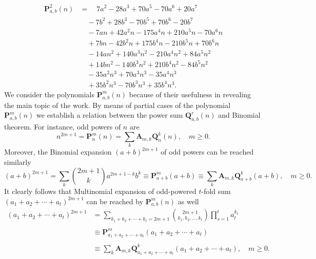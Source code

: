 \documentclass[12pt, letterpaper]{amsart}
\theoremstyle{definition}
\theoremstyle{remark}
\numberwithin{equation}{section}
\begin{document}
\begin{equation*}
\begin{split}
\mathbf{P}^{2}_{a,b}(n)
&= \quad 7 a^2 - 28 a^3 + 70 a^5 - 70 a^6 + 20 a^7 \\
&\quad - 7 b^2 + 28 b^3 - 70 b^5 + 70 b^6 - 20 b^7 \\
&\quad - 7 a n + 42 a^2 n - 175 a^4 n + 210 a^5 n -70 a^6 n \\
&\quad + 7 b n - 42 b^2 n + 175 b^4 n - 210 b^5 n + 70 b^6 n \\
&\quad - 14 a n^2 + 140 a^3 n^2 - 210 a^4 n^2 + 84 a^5 n^2 \\
&\quad + 14 b n^2 - 140 b^3 n^2 + 210 b^4 n^2 - 84 b^5 n^2 \\
&\quad - 35 a^2 n^3 + 70 a^3 n^3 - 35 a^4 n^3 \\
&\quad + 35 b^2 n^3 - 70 b^3 n^3 + 35 b^4 n^3.
\end{split}
\end{equation*}
We consider the polynomials $\mathbf{P}^{m}_{a,b}(n)$ because of their usefulness in revealing the main topic of the work. By means of partial cases of the polynomial $\mathbf{P}^{m}_{a,b}(n)$ we establish a relation between the power sum $\mathbf{Q}^{r}_{a,b}(n)$ and Binomial theorem. For instance, odd powers of $n$ are
\begin{equation*}
n^{2m+1} = \mathbf{P}^{m}_{n}(n) = \sum\limits_{k}\mathbf{A}_{m,k}\mathbf{Q}^{k}_{n}(n), \quad m\geq 0.
\end{equation*}
Moreover, the Binomial expansion $(a+b)^{2m+1}$ of odd powers can be reached similarly
\begin{equation*}
(a+b)^{2m+1}=\sum_{k} \binom{2m+1}{k} a^{2m+1-k} b^k \equiv \mathbf{P}^{m}_{a+b}(a+b) \equiv \sum\limits_{k}\mathbf{A}_{m,k}\mathbf{Q}^{k}_{a+b}(a+b), \quad m\geq 0.
\end{equation*}
It clearly follows that Multinomial expansion of odd-powered $t$-fold sum $(a_1+a_2+\cdots+a_t)^{2m+1}$ can be reached by $\mathbf{P}^{m}_{a,b}(n)$ as well
\begin{equation*}
\begin{split}
(a_1+a_2+\cdots+a_t)^{2m+1}
&=\sum_{k_1+k_2+\cdots+k_t=2m+1}\binom{2m+1}{k_1, k_2,\ldots, k_t} \prod_{s=1}^{t}a_t^{k_t} \\
\\
&\equiv\mathbf{P}^{m}_{a_1+a_2+\cdots+a_t}(a_1+a_2+\cdots+a_t)\\
\\
&\equiv\sum_{k}\mathbf{A}_{m,k}\mathbf{Q}^{k}_{a_1+a_2+\cdots+a_t}(a_1+a_2+\cdots+a_t), \quad m\geq 0.
\end{split}
\end{equation*}
\end{document}
